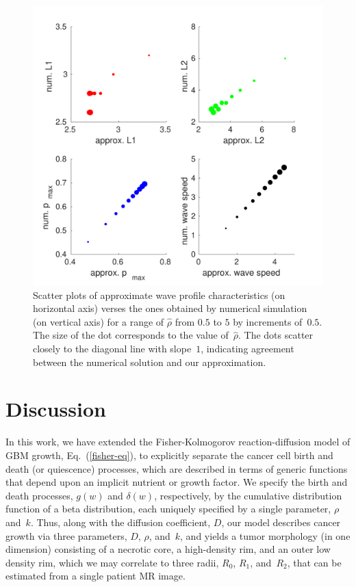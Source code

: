 \documentclass{aims}
\numberwithin{equation}{section}
\begin{document}
\begin{figure}
\begin{center}
\includegraphics[scale=0.67]{plots/scatterplot-new}
\end{center}
\caption{Scatter plots of approximate wave
profile characteristics (on horizontal axis) verses the ones obtained
by numerical simulation (on vertical axis) for a range of $\hat{\rho}$
from $0.5$ to $5$ by increments of~$0.5$. The size of the dot corresponds
to the value of~$\hat{\rho}$. The dots scatter closely to the diagonal line with
slope~$1$, indicating agreement between the numerical solution and
our approximation.}
\label{fig:comparison-to-numerical}
\end{figure}

\section{Discussion}

In this work, we have extended the Fisher-Kolmogorov reaction-diffusion
model of GBM growth, Eq.~(\ref{fisher-eq}), to explicitly separate the
cancer cell birth and death (or quiescence) processes, which are described
in terms of
generic functions that depend upon an implicit nutrient or growth factor.  We specify
the birth and death processes, $g(w)$ and $\delta(w)$, respectively, by the cumulative
distribution function of a
beta distribution, each uniquely specified by a single parameter, $\rho$ and~$k$. 
Thus, along with the diffusion coefficient, $D$, our model describes cancer
growth via three parameters, $D$, $\rho$, and~$k$, and yields a tumor morphology (in
one dimension) consisting of a necrotic core, a high-density rim, and an outer low
density rim, which we may correlate to three radii, $R_0$, $R_1$, and~$R_2$, that
can be estimated from a single patient MR image.
\end{document}
